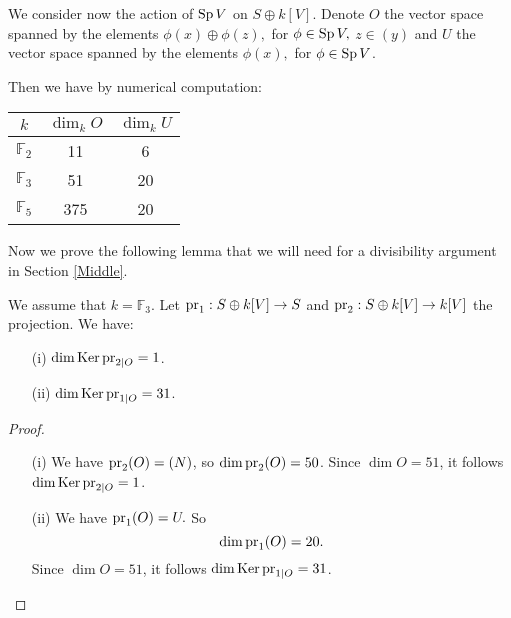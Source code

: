 We consider now the action of $\operatorname{Sp} V$ on $S\oplus k[V]$. 
Denote $O$ the vector space spanned by the elements $\phi(x)\oplus \phi(z),$ for $\phi \in \operatorname{Sp} V,$ $z \in (y)$
and $U$ the vector space spanned by the elements $\phi(x),$ for $\phi \in \operatorname{Sp} V$.
\begin{proposition}\label{CombinedSymplectic}
Then we have by numerical computation:
\vspace{2mm}
\begin{center}
\begin{tabular}{c||c|c}
 $k$ & $\dim_k O$  & $\dim_k U$\\
\hline
$\mathbb F_2$ & 11 & 6 \\
$\mathbb F_3$ & 51  & 20 \\
$\mathbb F_5$ & 375  & 20 
\end{tabular}
\end{center}
\end{proposition}
Now we prove the following lemma that we will need for a divisibility argument in Section \ref{Middle}.
\begin{lemme}\label{cleffinclassesdiv}
We assume that $k=\mathbb F_3$. Let $\operatorname{pr}_1: S\oplus k[V]\rightarrow S$ and $\operatorname{pr}_2: S\oplus k[V]\rightarrow k[V]$ the projection. 
We have: 
\begin{itemize}
\item[(i)]
$\dim \operatorname{Ker}\operatorname{pr}_{2|O}=1$.
\item[(ii)]
$\dim \operatorname{Ker}\operatorname{pr}_{1|O}=31$.
\end{itemize}
\end{lemme}
\begin{proof}
\begin{itemize}
\item[(i)]
We have $\operatorname{pr}_{2}(O)=(N)$, so $\dim \operatorname{pr}_{2}(O)=50$.
Since $\dim O=51$, it follows $\dim \operatorname{Ker}\operatorname{pr}_{2|O}=1$. 
\item[(ii)]
We have $\operatorname{pr}_{1}(O)=U.$
So $$\dim \operatorname{pr}_{1}(O)=20.$$
Since $\dim O=51$,
it follows $\dim \operatorname{Ker}\operatorname{pr}_{1|O}=31$.
\end{itemize}
\end{proof}